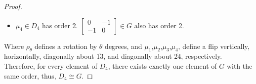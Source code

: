 \documentclass[hidelinks,12pt]{article}
\begin{document}
\begin{itemize}
\begin{proof}
\begin{itemize}
    \item $\mu_4\in D_4$ has order 2. $\begin{bmatrix}
0 & -1\\
-1 & 0
\end{bmatrix}\in G$ also has order 2.
\end{itemize}
Where $\rho_{\theta}$ defines a rotation by $\theta$ degrees, and $\mu_1$,$\mu_2$,$\mu_3$,$\mu_4$, define a flip vertically, horizontally, diagonally about $\overline{13}$, and diagonally about $\overline{24}$, respectively. Therefore, for every element of $D_4$, there exists exactly one element of $G$ with the same order, thus, $D_4\cong G$.
\end{proof}
\end{itemize}
\end{document}
